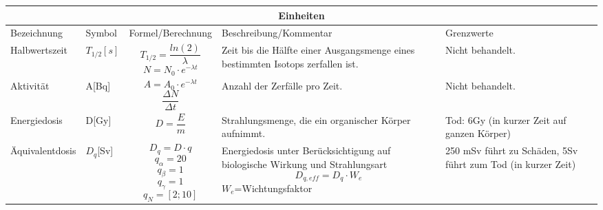 \documentclass{article}
\begin{document}
        \begin{tabular}{ |p{4cm}|p{1cm}|p{3cm}|p{4cm}|p{4cm}|  }
            \hline
            \multicolumn{5}{|c|}{\textbf{Einheiten}} \\
            \hline
            Bezeichnung & Symbol & Formel/Berechnung & Beschreibung/Kommentar & Grenzwerte \\
            \hline
            Halbwertszeit   & $ T_{1/2} [s] $   & \[ T_{1/2}=\frac{ln(2)}{\lambda} \] \[N=N_0 \cdot e^{-\lambda t}\] &   Zeit bis die Hälfte einer Ausgangsmenge eines bestimmten Isotops zerfallen ist. & Nicht behandelt. \\
            \hline
            Aktivität & A[Bq] &   \[A=A_0 \cdot e^{-\lambda t}\] \[\frac{\Delta N}{\Delta t}\]  & Anzahl der Zerfälle pro Zeit.   & Nicht behandelt. \\
            \hline
            Energiedosis & D[Gy] & \[D=\frac{E}{m}\] &  Strahlungsmenge, die ein organischer Körper aufnimmt. & Tod: 6Gy (in kurzer Zeit auf ganzen Körper)\\
            \hline
            Äquivalentdosis & $D_q$[Sv]& \[ D_q = D \cdot q \] \[q_{\alpha}=20\] \[q_{\beta}=1\]\[q_{\gamma}=1\] \[q_{N}=[2;10]\] & Energiedosis unter Berücksichtigung auf biologische Wirkung und Strahlungsart \[D_{q,eff}=D_q \cdot W_e\] $W_e$=Wichtungsfaktor & 250 mSv führt zu Schäden, 5Sv führt zum Tod (in kurzer Zeit) \\
            \hline
           \end{tabular}
        
\end{document}
